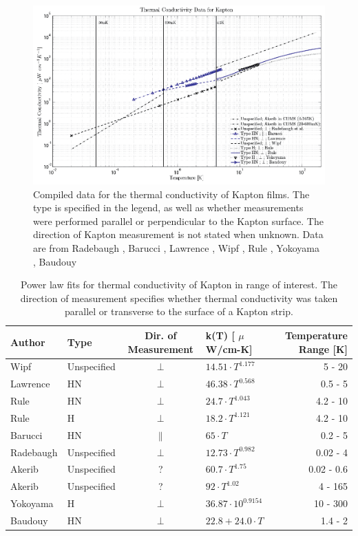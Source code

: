 \documentclass{report}
\begin{document}
\begin{figure}[h]
\includegraphics[width = .9\textwidth]{Kapton_var.png}
\caption{Compiled data for the thermal conductivity of Kapton films. The type is specified in the legend, as well as whether measurements were performed parallel or perpendicular to the Kapton surface. The direction of Kapton measurement is not stated when unknown. Data are from Radebaugh \cite{rad73}, Barucci \cite{bar}, Lawrence \cite{law}, Wipf \cite{wip}, Rule \cite{Rule1996}, Yokoyama \cite{yok}, Baudouy \cite{Baudouy2003} }
\end{figure}

\begin{table}[h]
\centering
\begin{threeparttable}
\begin{tabular}{llclr}
\toprule
Author & Type & Dir. of Measurement & k(T) [ $\mu$W/cm-K] & Temperature Range [K]\\
\midrule
Wipf \cite{wip} & Unspecified & $\perp$ & $14.51 \cdot T^{1.177}$ & 5 - 20 \\
Lawrence \cite{law} & HN & $\perp$ & $46.38 \cdot T^{0.568}$ & 0.5 - 5 \\
Rule \cite{Rule1996} & HN & $\perp$ & $24.7 \cdot T^{1.043}$ & 4.2 - 10 \\
Rule \cite{Rule1996} & H & $\perp$ & $18.2 \cdot T^{1.121}$ & 4.2 - 10 \\
Barucci \cite{bar} & HN & $\parallel$ & $65 \cdot T$ & 0.2 - 5 \\
Radebaugh \cite{rad73} & Unspecified & $\perp$ & $12.73 \cdot T^{0.982}$ & 0.02 - 4 \\
Akerib & Unspecified & ? & $60.7 \cdot T^{1.75}$ & 0.02 - 0.6  \\
Akerib & Unspecified & ? & $92 \cdot T^{1.02}$ & 4 - 165 \\
Yokoyama \cite{yok} & H & $\perp$ & $36.87 \cdot 10^{0.9154}$ & 10 - 300 \\
Baudouy \cite{Baudouy2003} & HN & $\perp$ & $22.8 + 24.0 \cdot T$ & 1.4 - 2 \\
\bottomrule
\end{tabular}
\caption{Power law fits for thermal conductivity of Kapton in range of interest. The direction of measurement specifies whether thermal conductivity was taken parallel or transverse to the surface of a Kapton strip.}
\end{threeparttable}
\end{table}
\end{document}
